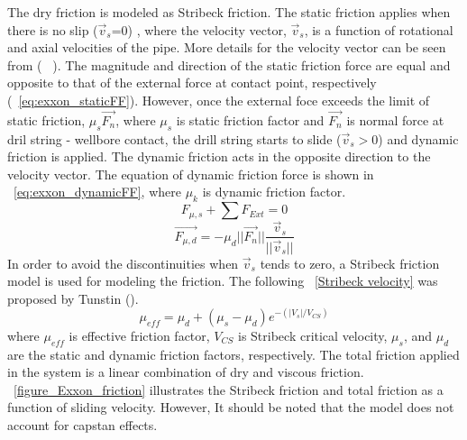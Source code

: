 The dry friction is modeled as Stribeck friction.  \resolvedcomment{}  The static friction applies when there is no slip ($\vec{v}_s$=0) , where the velocity vector, $\vec{v}_s$, is a function of rotational and axial velocities of the pipe. More details for the velocity vector can be seen from (~ \cite{ref:cayeux2018a}). The magnitude and direction of the static friction force are equal and opposite to that of the external force at contact point, respectively (\equationname~\ref{eq:exxon_staticFF}). However, once the external foce exceeds the limit of static friction, $\mu_s \vec{F_n}$, where $\mu_s$ is static friction factor and $\vec{F_n}$ is normal force at dril string - wellbore contact, the drill string starts to slide ($\vec{v}_s > 0$) and dynamic friction is applied. The dynamic friction acts in the opposite direction to the velocity vector. The equation of dynamic friction force is shown in \equationname~\ref{eq:exxon_dynamicFF}, where $\mu_k$ is dynamic friction factor.
\begin{equation}\label{eq:exxon_staticFF}
  F_{\mu,s} + \sum F_{Ext} = 0
\end{equation}
\begin{equation}\label{eq:exxon_dynamicFF}
  \vec{F_{\mu, d}} = -\mu_d ||{\vec{F_n}}||\frac{\vec{v}_s}{{||\vec{v}_s}||}
\end{equation}
In order to avoid the discontinuities when $\vec{v}_s$ tends to zero, a Stribeck friction model is used for modeling the friction. The following \equationname~\ref{Stribeck velocity} was proposed by Tunstin (\cite{ref:tustin1947a}).
\begin{equation}\label{Stribeck velocity}
\mu_{eff} = \mu_{d} + (\mu_{s} - \mu_{d}) e^{-(|V_s|/V_{CS})}
\end{equation}
where $\mu_{eff}$ is effective friction factor, $V_{CS}$ is Stribeck critical velocity, $\mu_{s}$, and $\mu_{d}$ are the static and dynamic friction factors, respectively. The total friction applied in the system is a linear combination of dry and viscous friction. \figurename~\ref{figure_Exxon_friction} illustrates the Stribeck friction and total friction as a function of sliding velocity. However, It should be noted that the model does not account for capstan effects. \resolvedcomment{}
